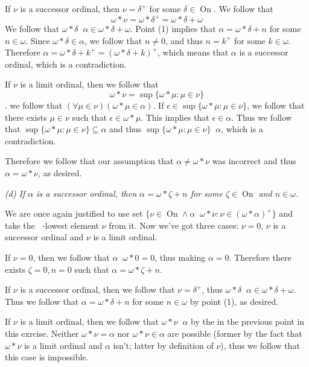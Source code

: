 \documentclass[11pt,oneside,titlepage]{book}
\DeclareMathOperator \On {On}
\DeclareMathOperator \ineq {\underline{\in}}
\newcommand{\set}[1]{\{ #1 \}}
\begin{document}
If $\nu$ is a successor ordinal, then $\nu = \delta^+$ for some $\delta \in \On$.
We follow that
$$\omega * \nu = \omega * \delta^+ = \omega * \delta + \omega$$
We follow that $\omega * \delta \ineq \alpha \in \omega * \delta + \omega$.
Point (1) implies that $\alpha = \omega * \delta + n$ for some $n \in \omega$. Since
$\omega * \delta \in \alpha$, we follow that $n \neq 0$, and thus $n = k^+$ for some
$k \in \omega$. Therefore $\alpha = \omega * \delta + k^+ = (\omega * \delta + k)^+$,
which means that $\alpha$ is a successor ordinal, which is a contradiction.

If $\nu$ is a limit ordinal, then we follow that
$$\omega * \nu = \sup\set{\omega * \mu: \mu \in \nu}$$.
we follow that $(\forall \mu \in \nu)(\omega * \mu \in \alpha)$.
If $\epsilon \in \sup\set{\omega * \mu: \mu \in \nu}$, we follow that there
exists $\mu \in \nu$ such that $\epsilon \in \omega * \mu$. This implies that
$\epsilon \in \alpha$. Thus we follow that $\sup\set{\omega * \mu: \mu \in \nu} \subseteq
\alpha$ and thus $\sup\set{\omega * \mu: \mu \in \nu} \ineq \alpha$, which is a
contradiction.

Therefore we follow that our assumption that $\alpha \neq \omega * \nu$ was incorrect and
thus $\alpha = \omega * \nu$, as desired.

\textit{(d) If $\alpha$ is a successor ordinal, then $\alpha = \omega * \zeta + n$
  for some $\zeta \in \On$ and $n \in \omega$.}

We are once again justified to use set
$\set{\nu \in \On \land \alpha \ineq \omega * \nu: \nu \in (\omega * \alpha)^+}$
and take the $\ineq$-lowest element $\nu$ from it. Now we've got three cases:
$\nu = 0$, $\nu$ is a successor ordinal and $\nu$ is a limit ordinal.

If $\nu = 0$, then we follow that $\alpha \ineq \omega * 0 = 0$, thus making
$\alpha = 0$. Therefore there exists $\zeta = 0, n = 0$ such that
$\alpha = \omega * \zeta + n$.

If $\nu$ is a successor ordinal, then we follow that $\nu = \delta^+$, thus
$\omega * \delta \ineq \alpha \in \omega * \delta + \omega$. Thus we follow that
$\alpha = \omega * \delta + n$ for some $n \in \omega$ by point (1), as desired.

If $\nu$ is a limit ordinal, then we follow that $\omega * \nu \ineq \alpha$ by the
in the previous point in this exrcise. Neither
$\omega * \nu = \alpha$ nor $\omega * \nu \in \alpha$ are possible (former by the fact that
$\omega * \nu$ is a limit ordinal and $\alpha$ isn't; latter by definition of $\nu$),
thus we follow that this case is impossible.
\end{document}
